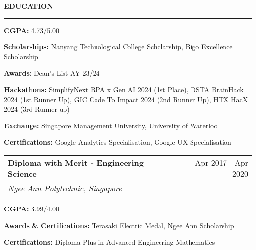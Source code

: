 \documentclass[11pt,letterpaper]{article}
\makeatletter
\newcommand{\resheading}[1]{%
  \vspace{2pt}
  {\normalsize \textbf{\MakeUppercase{#1}}}\\
  \vspace{-8pt}
  \hrule
}
\newcommand{\resitem}[1]{\item \small #1 \vspace{-2pt}}
\newcommand{\ressubheading}[4]{
    \vspace{2pt}
    \begin{tabular*}{\textwidth}{l@{\extracolsep{\fill}}r}
        \small \textbf{#1} & \small #2 \\
        \small \textit{#3} & \small \textit{#4} \\
    \end{tabular*}\vspace{-3pt}}
\makeatother
\begin{document}
\resheading{Education}
\begin{leftitemize}
\item[]
\begin{subitemize}
    \resitem{\textbf{CGPA:} 4.73/5.00}
    \resitem{\textbf{Scholarships:} Nanyang Technological College Scholarship, Bigo Excellence Scholarship}
    \resitem{\textbf{Awards:} Dean's List AY 23/24}
    \resitem{\textbf{Hackathons:} SimplifyNext RPA x Gen AI 2024 (1st Place), DSTA BrainHack 2024 (1st Runner Up), GIC Code To Impact 2024 (2nd Runner Up), HTX HacX 2024 (3rd Runner up)}
    \resitem{\textbf{Exchange:} Singapore Management University, University of Waterloo}
    \resitem{\textbf{Certifications:} Google Analytics Specialisation, Google UX Specialisation}
\end{subitemize}

\item[]
\ressubheading{Diploma with Merit - Engineering Science}{Apr 2017 - Apr 2020}{Ngee Ann Polytechnic, Singapore}{}
\begin{subitemize}
    \resitem{\textbf{CGPA:} 3.99/4.00}
    \resitem{\textbf{Awards \& Certifications:} Terasaki Electric Medal, Ngee Ann Scholarship}
    \resitem{\textbf{Certifications:} Diploma Plus in Advanced Engineering Mathematics}
\end{subitemize}
\end{leftitemize}
\end{document}
